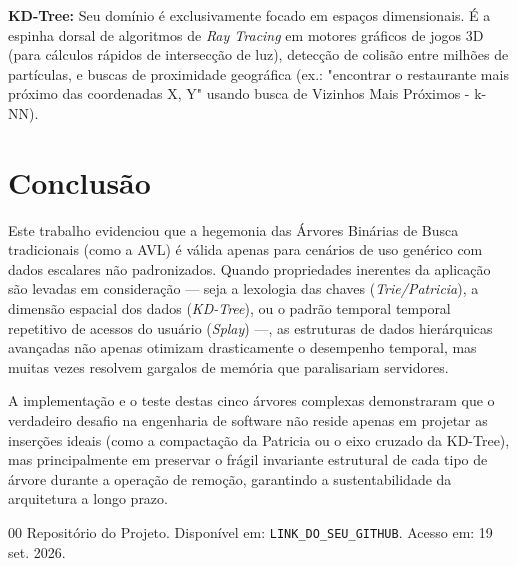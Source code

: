 \documentclass[conference]{IEEEtran}
\begin{document}
\textbf{KD-Tree:} Seu domínio é exclusivamente focado em espaços dimensionais. É a espinha dorsal de algoritmos de \textit{Ray Tracing} em motores gráficos de jogos 3D (para cálculos rápidos de intersecção de luz), detecção de colisão entre milhões de partículas, e buscas de proximidade geográfica (ex.: "encontrar o restaurante mais próximo das coordenadas X, Y" usando busca de Vizinhos Mais Próximos - k-NN).

\section{Conclusão}

Este trabalho evidenciou que a hegemonia das Árvores Binárias de Busca tradicionais (como a AVL) é válida apenas para cenários de uso genérico com dados escalares não padronizados. Quando propriedades inerentes da aplicação são levadas em consideração — seja a lexologia das chaves (\textit{Trie/Patricia}), a dimensão espacial dos dados (\textit{KD-Tree}), ou o padrão temporal temporal repetitivo de acessos do usuário (\textit{Splay}) —, as estruturas de dados hierárquicas avançadas não apenas otimizam drasticamente o desempenho temporal, mas muitas vezes resolvem gargalos de memória que paralisariam servidores.

A implementação e o teste destas cinco árvores complexas demonstraram que o verdadeiro desafio na engenharia de software não reside apenas em projetar as inserções ideais (como a compactação da Patricia ou o eixo cruzado da KD-Tree), mas principalmente em preservar o frágil invariante estrutural de cada tipo de árvore durante a operação de remoção, garantindo a sustentabilidade da arquitetura a longo prazo.

\begin{thebibliography}{00}
 Repositório do Projeto. Disponível em: \texttt{LINK\_DO\_SEU\_GITHUB}. Acesso em: 19 set. 2026.
\end{thebibliography}
\end{document}
